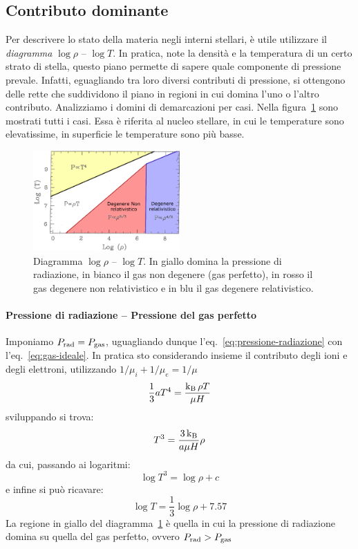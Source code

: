 \subsection{Contributo dominante}
Per descrivere lo stato della materia negli interni stellari, è utile utilizzare il \emph{diagramma} $\log \rho$ -- $\log T$. In pratica, note la densità e la temperatura di un certo strato di stella, questo piano permette di sapere quale componente di pressione prevale. Infatti, eguagliando tra loro diversi contributi di pressione, si ottengono delle rette che suddividono il piano in regioni in cui domina l'uno o l'altro contributo. Analizziamo i domini di demarcazioni per casi. Nella figura~\ref{fig:diagramma-logrho-logt} sono mostrati tutti i casi. Essa è riferita al nucleo stellare, in cui le temperature sono elevatissime, in superficie le temperature sono più basse.

\begin{figure}
\centering
\includegraphics[width=0.5\textwidth]{immagini/piano-log-log.png}
\caption{Diagramma $\log \rho$ -- $\log T$. In giallo domina la pressione di radiazione, in bianco il gas non degenere (gas perfetto), in rosso il gas degenere non relativistico e in blu il gas degenere relativistico.}
\label{fig:diagramma-logrho-logt}
\end{figure}

\paragraph{Pressione di radiazione -- Pressione del gas perfetto}
Imponiamo $P_\textup{rad} = P_\textup{gas}$, uguagliando dunque l'eq.~\eqref{eq:pressione-radiazione} con l'eq.~\eqref{eq:gas-ideale}. In pratica sto considerando insieme il contributo degli ioni e degli elettroni, utilizzando $1/ \mu_i + 1 / \mu_e = 1 / \mu$
\[
\frac{1}{3} a T^4 = \frac{\operatorname{k_B} \rho T}{\mu H}
\]
sviluppando si trova:
\[
T^3 = \dfrac{3\operatorname{k_B}}{a\mu H} \rho
\]
da cui, passando ai logaritmi:
\[
\log T^3 = \log \rho + c
\]
e infine si può ricavare:
\begin{equation}\label{prad-pgas}
    \log T = \frac{1}{3} \log \rho + 7.57
\end{equation}
La regione in giallo del diagramma~\ref{fig:diagramma-logrho-logt} è quella in cui la pressione di radiazione domina su quella del gas perfetto, ovvero $P_\textup{rad} > P_\textup{gas}$

